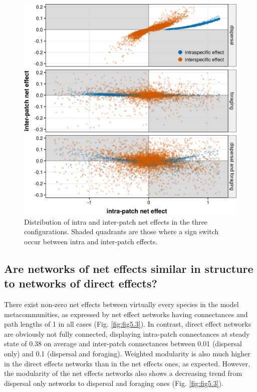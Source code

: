 \begin{figure}[!ht]
\centering
\includegraphics[width=.7\textwidth,height=\textheight,keepaspectratio]{./Figures/chapter05/Fig_2.png}
\caption[Intra and interpatch net effects]{\color{Gray}Distribution of intra and inter-patch net effects in the three configurations. Shaded quadrants are those where a sign switch occur between intra and inter-patch effects.}\label{fig:fig5.2}
\end{figure}

\FloatBarrier

\subsection*{Are networks of net effects similar in structure to networks of direct effects?}

There exist non-zero net effects between virtually every species in the model metacommunities, as expressed by net effect networks having connectances and path lengths of 1 in all cases (Fig. \ref{fig:fig5.3}). In contrast, direct effect networks are obviously not fully connected, displaying intra-patch connectances at steady state of 0.38 on average and inter-patch connectances between 0.01 (dispersal only) and 0.1 (dispersal and foraging). Weighted modularity is also much higher in the direct effects networks than in the net effects ones, as expected. However, the modularity of the net effects networks also shows a decreasing trend from dispersal only networks to dispersal and foraging ones (Fig. \ref{fig:fig5.3}).

